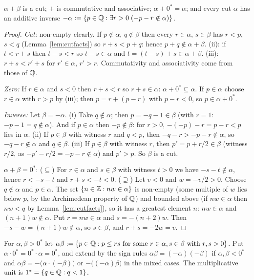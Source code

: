 \begin{theorem}\label{thm:cut-add}
	$\alpha+\beta$ is a cut; $+$ is commutative and associative; $\alpha+0^*=\alpha$; and every cut $\alpha$ has an additive inverse $-\alpha:=\{p\in\mathbb{Q}:\exists r>0\;(-p-r\notin\alpha)\}$.
\end{theorem}
\begin{proof}
	\emph{Cut:} non-empty clearly. If $p\notin\alpha$, $q\notin\beta$ then every $r\in\alpha$, $s\in\beta$ has $r<p$, $s<q$ (Lemma~\ref{lem:cutfacts}) so $r+s<p+q$: hence $p+q\notin\alpha+\beta$. (ii): if $t<r+s$ then $t-s<r$ so $t-s\in\alpha$ and $t=(t-s)+s\in\alpha+\beta$. (iii): $r+s<r'+s$ for $r'\in\alpha$, $r'>r$. Commutativity and associativity come from those of $\mathbb{Q}$.
	
	\emph{Zero:} If $r\in\alpha$ and $s<0$ then $r+s<r$ so $r+s\in\alpha$: $\alpha+0^*\subseteq\alpha$. If $p\in\alpha$ choose $r\in\alpha$ with $r>p$ by (iii); then $p=r+(p-r)$ with $p-r<0$, so $p\in\alpha+0^*$.
	
	\emph{Inverse:} Let $\beta=-\alpha$. (i) Take $q\notin\alpha$; then $p=-q-1\in\beta$ (with $r=1$: $-p-1=q\notin\alpha$). And if $p\in\alpha$ then $-p\notin\beta$: for $r>0$, $-(-p)-r=p-r<p$ lies in $\alpha$. (ii) If $p\in\beta$ with witness $r$ and $q<p$, then $-q-r>-p-r\notin\alpha$, so $-q-r\notin\alpha$ and $q\in\beta$. (iii) If $p\in\beta$ with witness $r$, then $p'=p+r/2\in\beta$ (witness $r/2$, as $-p'-r/2=-p-r\notin\alpha$) and $p'>p$. So $\beta$ is a cut.
	
	$\alpha+\beta=0^*$: ($\subseteq$) For $r\in\alpha$ and $s\in\beta$ with witness $t>0$ we have $-s-t\notin\alpha$, hence $r<-s-t$ and $r+s<-t<0$. ($\supseteq$) Let $v<0$ and $w=-v/2>0$. Choose $q\notin\alpha$ and $p\in\alpha$. The set $\{n\in\mathbb{Z}:nw\in\alpha\}$ is non-empty (some multiple of $w$ lies below $p$, by the Archimedean property of $\mathbb{Q}$) and bounded above (if $nw\in\alpha$ then $nw<q$ by Lemma~\ref{lem:cutfacts}), so it has a greatest element $n$: $nw\in\alpha$ and $(n+1)w\notin\alpha$. Put $r=nw\in\alpha$ and $s=-(n+2)w$. Then $-s-w=(n+1)w\notin\alpha$, so $s\in\beta$, and $r+s=-2w=v$.
\end{proof}

\begin{definition}[Multiplication]
	For $\alpha,\beta>0^*$ let $\alpha\beta:=\{p\in\mathbb{Q}:p\le rs\text{ for some }r\in\alpha,s\in\beta\text{ with }r,s>0\}$. Put $\alpha\cdot0^*=0^*\cdot\alpha=0^*$, and extend by the sign rules $\alpha\beta=(-\alpha)(-\beta)$ if $\alpha,\beta<0^*$ and $\alpha\beta=-\bigl(\alpha\cdot(-\beta)\bigr)$ or $-\bigl((-\alpha)\beta\bigr)$ in the mixed cases. The multiplicative unit is $1^*=\{q\in\mathbb{Q}:q<1\}$.
\end{definition}

